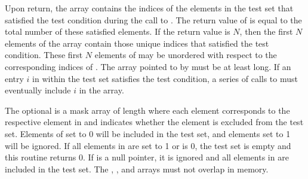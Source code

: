 \begin{apidefinition}
{    Upon return, the  array contains the indices of the elements
    in the test set that satisfied the test condition during the call to
    .  The return value of
     is equal to the total number of
    these satisfied elements.  If the return value is $N$, then the first $N$
    elements of the  array contain those unique indices that
    satisfied the test condition.  These first $N$ elements of 
    may be unordered with respect to the corresponding indices of .
    The array pointed to by  must be at least  long.
    If an entry $i$ in  within the test set satisfies the test
    condition, a series of calls to 
    must eventually include $i$ in the  array.

    The optional  is a mask array of length  where each element
    corresponds to the respective element in  and indicates whether
    the element is excluded from the test set.  Elements of  set to
    0 will be included in the test set, and elements set to 1 will be ignored.  If all
    elements in  are set to 1 or  is 0, the test set is
    empty and this routine returns 0.  If  is a null pointer, it is ignored and all
    elements in  are included in the test set.  The ,
    , and  arrays must not overlap in memory.
}




\end{apidefinition}
